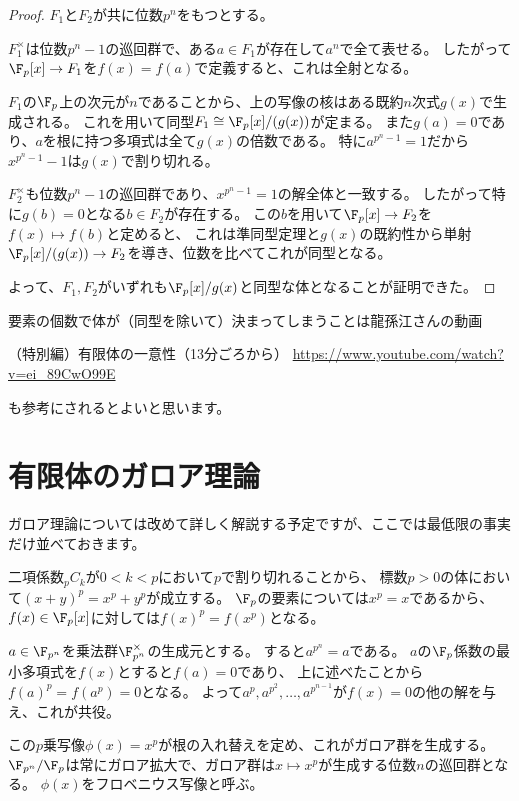 \documentclass[uplatex]{jsarticle}
\begin{document}
\begin{proof}
  $F_1$と$F_2$が共に位数$p^n$をもつとする。

  $F_1^\times$は位数$p^n-1$の巡回群で、ある$a\in F_1$が存在して$a^n$で全て表せる。
  したがって$\F_p[x]\to F_1$を$f(x)=f(a)$で定義すると、これは全射となる。

  $F_1$の$\F_p$上の次元が$n$であることから、上の写像の核はある既約$n$次式$g(x)$で生成される。
  これを用いて同型$F_1\cong\F_p[x]/(g(x))$が定まる。
  また$g(a)=0$であり、$a$を根に持つ多項式は全て$g(x)$の倍数である。
  特に$a^{p^n-1}=1$だから$x^{p^n-1}-1$は$g(x)$で割り切れる。

  $F_2^\times$も位数$p^n-1$の巡回群であり、$x^{p^n-1}=1$の解全体と一致する。
  したがって特に$g(b)=0$となる$b\in F_2$が存在する。
  この$b$を用いて$\F_p[x]\to F_2$を$f(x)\mapsto f(b)$と定めると、
  これは準同型定理と$g(x)$の既約性から単射$\F_p[x]/(g(x))\to F_2$を導き、位数を比べてこれが同型となる。

  よって、$F_1, F_2$がいずれも$\F_p[x]/g(x)$と同型な体となることが証明できた。
\end{proof}

要素の個数で体が（同型を除いて）決まってしまうことは龍孫江さんの動画

（特別編）有限体の一意性（13分ごろから）
\url{https://www.youtube.com/watch?v=ei_89CwO99E}

も参考にされるとよいと思います。

\section{有限体のガロア理論}

ガロア理論については改めて詳しく解説する予定ですが、ここでは最低限の事実だけ並べておきます。

二項係数${}_pC_k$が$0<k<p$において$p$で割り切れることから、
標数$p>0$の体において$(x+y)^p=x^p+y^p$が成立する。
$\F_p$の要素については$x^p=x$であるから、$f(x)\in\F_p[x]$に対しては$f(x)^p=f(x^p)$となる。

$a\in \F_{p^n}$を乗法群$\F_{p^n}^\times$の生成元とする。
すると$a^{p^n}=a$である。
$a$の$\F_p$係数の最小多項式を$f(x)$とすると$f(a)=0$であり、
上に述べたことから$f(a)^p=f(a^p)=0$となる。
よって$a^p, a^{p^2},\ldots,a^{p^{n-1}}$が$f(x)=0$の他の解を与え、これが共役。

この$p$乗写像$\phi(x)=x^p$が根の入れ替えを定め、これがガロア群を生成する。
$\F_{p^n}/\F_p$は常にガロア拡大で、ガロア群は$x\mapsto x^p$が生成する位数$n$の巡回群となる。
$\phi(x)$をフロベニウス写像と呼ぶ。
\end{document}
